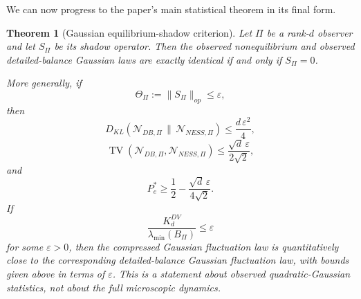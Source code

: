 \documentclass[11pt,a4paper]{article}
\numberwithin{equation}{section}
\theoremstyle{thmcompact}
\newtheorem{theorem}{Theorem}[section]
\theoremstyle{remark}
\begin{document}
We can now progress to the paper's main statistical theorem in its final form.

\begin{theorem}[Gaussian equilibrium-shadow criterion]
\label{thm:equilibrium_shadow_criterion}
Let \(\Pi\) be a rank-\(d\) observer and let \(S_\Pi\) be its shadow operator. Then the observed nonequilibrium and observed detailed-balance Gaussian laws are exactly identical if and only if \(S_\Pi=0\).

More generally, if
\begin{equation}
\Theta_\Pi:=\|S_\Pi\|_{op}\le \varepsilon,
\end{equation}
then
\begin{equation}
D_{KL}\!\left(\mathcal N_{DB,\Pi}\,\|\,\mathcal N_{NESS,\Pi}\right)
\le
\frac{d\,\varepsilon^2}{4},
\end{equation}
\begin{equation}
\operatorname{TV}\!\left(\mathcal N_{DB,\Pi},\mathcal N_{NESS,\Pi}\right)
\le
\frac{\sqrt d\,\varepsilon}{2\sqrt2},
\end{equation}
and
\begin{equation}
P_e^\ast
\ge
\frac12-\frac{\sqrt d\,\varepsilon}{4\sqrt2}.
\end{equation}
If
\begin{equation}
\frac{K_d^{DV}}{\lambda_{\min}(B_\Pi)}\le \varepsilon
\end{equation}
for some \(\varepsilon>0\), then the compressed Gaussian fluctuation law is quantitatively close to the corresponding detailed-balance Gaussian fluctuation law, with bounds given above in terms of \(\varepsilon\). This is a statement about observed quadratic-Gaussian statistics, not about the full microscopic dynamics.
\end{theorem}
\end{document}
